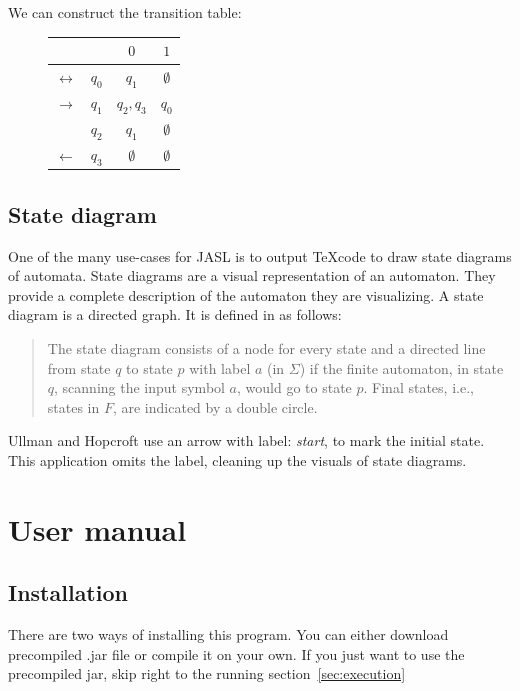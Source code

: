 \documentclass{ctuthesis}
\begin{document}
We can construct the transition table:

\begin{figure}[H]
\begin{ctucolortab}
\begin{tabular}{cc|cc}
	&&$0$ & $1$ \\\hline
	$\leftrightarrow$ & $q_0$ & $q_1$ & $\emptyset$ \\
	$\rightarrow$ & $q_1$ & $q_2,q_3$ & $q_0$ \\
	& $q_2$ & $q_1$ & $\emptyset$ \\
	$\leftarrow$ & $q_3$ & $\emptyset$ & $\emptyset$
\end{tabular}
\end{ctucolortab}
\end{figure}

\section{State diagram}
One of the many use-cases for JASL is to output \TeX code to draw state diagrams of automata. State diagrams are a visual representation of an automaton. They provide a complete description of the automaton they are visualizing. A state diagram is a directed graph. It is defined in 
\cite[Example 3.1, p.27]{hopcroft} as follows:
\begin{quote}
	The state diagram consists of a node for every state and a directed line from state $q$ to state $p$ with label $a$ (in $\Sigma$) if the finite automaton, in state $q$, scanning the input symbol $a$, would go to state $p$. Final states, i.e., states in $F$, are indicated by a double circle.
\end{quote}

Ullman and Hopcroft use an arrow with label: \textit{start}, to mark the initial state. This application omits the label, cleaning up the visuals of state diagrams.

\chapter{User manual}
\section{Installation}
There are two ways of installing this program. You can either download precompiled .jar file or compile it on your own. If you just want to use the precompiled jar, skip right to the running section~\ref{sec:execution}
\end{document}
